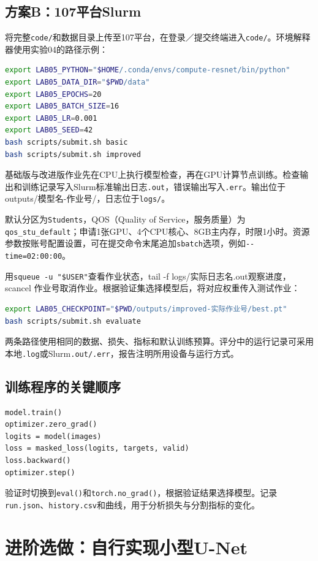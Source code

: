 \documentclass[UTF8,a4paper,11pt,fontset=fandol]{ctexart}
\newcommand{\file}[1]{\nolinkurl{#1}}
\begin{document}
\subsection{方案B：107平台Slurm}
将完整\file{code/}和数据目录上传至107平台，在登录／提交终端进入\file{code/}。环境解释器使用实验04的路径示例：
\begin{lstlisting}[language=bash]
export LAB05_PYTHON="$HOME/.conda/envs/compute-resnet/bin/python"
export LAB05_DATA_DIR="$PWD/data"
export LAB05_EPOCHS=20
export LAB05_BATCH_SIZE=16
export LAB05_LR=0.001
export LAB05_SEED=42
bash scripts/submit.sh basic
bash scripts/submit.sh improved
\end{lstlisting}
基础版与改进版作业先在CPU上执行模型检查，再在GPU计算节点训练。检查输出和训练记录写入Slurm标准输出日志\file{.out}，错误输出写入\file{.err}。输出位于\textrm{outputs/模型名-作业号/}，日志位于\file{logs/}。

默认分区为\file{Students}，QOS（Quality of Service，服务质量）为\file{qos_stu_default}；申请1张GPU、4个CPU核心、8GB主内存，时限1小时。资源参数按账号配置设置，可在提交命令末尾追加\file{sbatch}选项，例如\file{--time=02:00:00}。

用\texttt{squeue -u "\$USER"}查看作业状态，\textrm{tail -f logs/实际日志名.out}观察进度，\textrm{scancel 作业号}取消作业。根据验证集选择模型后，将对应权重传入测试作业：
\begin{lstlisting}[language=bash]
export LAB05_CHECKPOINT="$PWD/outputs/improved-实际作业号/best.pt"
bash scripts/submit.sh evaluate
\end{lstlisting}
两条路径使用相同的数据、损失、指标和默认训练预算。评分中的运行记录可采用本地\file{.log}或Slurm\file{.out/.err}，报告注明所用设备与运行方式。
\subsection{训练程序的关键顺序}
\begin{lstlisting}
model.train()
optimizer.zero_grad()
logits = model(images)
loss = masked_loss(logits, targets, valid)
loss.backward()
optimizer.step()
\end{lstlisting}
验证时切换到\file{eval()}和\file{torch.no_grad()}，根据验证结果选择模型。记录\file{run.json}、\file{history.csv}和曲线，用于分析损失与分割指标的变化。
\clearpage

\section{进阶选做：自行实现小型U-Net}
\end{document}
